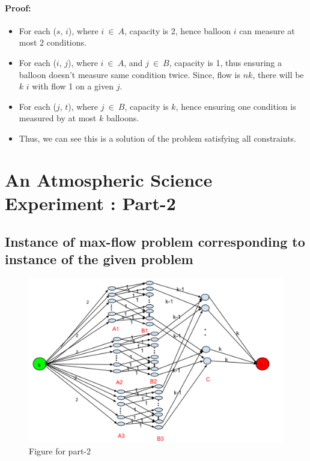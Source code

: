 \documentclass[pdftex,a4paper,12pt]{report}
\begin{document}
\begin{itemize}
\paragraph{Proof:}
\begin{itemize}
\item For each ($s$, $i$), where $i\ \in\ A$, capacity is 2, hence balloon $i$ can measure at most 2 conditions.
\item For each ($i$, $j$), where $i\ \in\ A$, and $j\ \in\ B$, capacity is 1, thus ensuring a balloon doesn't measure same condition twice. Since, flow is $nk$, there will be $k$ $i$ with flow 1 on a given $j$.
\item For each ($j$, $t$), where $j\ \in\ B$, capacity is $k$, hence ensuring one condition is measured by at most $k$ balloons.
\item Thus, we can see this is a solution of the problem satisfying all constraints.
\end{itemize}
\end{itemize}

\section{An Atmospheric Science Experiment : Part-2}

\subsection{Instance of max-flow problem corresponding to instance of the given problem}

\begin{figure}[ht!]
\centering
\includegraphics[width=150mm]{fig2.png}
\caption{Figure for part-2}
\label{fig:fig2}
\end{figure}
\end{document}
